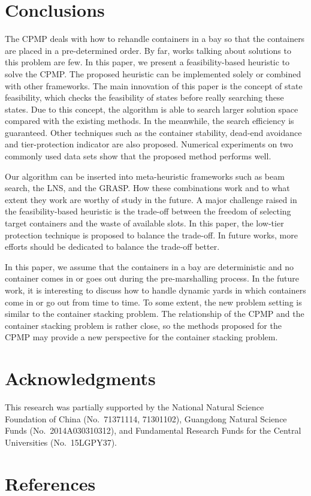 \documentclass[review,3p,times,12pt,number]{elsarticle}\usepackage{amsmath}\usepackage{amssymb}
\begin{document}
\section{Conclusions}
\label{sec:conclusion}
The CPMP deals with how to rehandle containers in a bay so that the containers are placed in a pre-determined order. By far, works talking about solutions to this problem are few.
In this paper, we present a feasibility-based heuristic to solve the CPMP\@. The proposed heuristic can be implemented solely or combined with other frameworks.
The main innovation of this paper is the concept of state feasibility, which checks the feasibility of states before really searching these states.
Due to this concept, the algorithm is able to search larger solution space compared with the existing methods. In the meanwhile, the search efficiency is guaranteed. Other techniques such as the container stability, dead-end avoidance and tier-protection indicator are also proposed.
Numerical experiments on two commonly used data sets show that the proposed method performs well.

Our algorithm can be inserted into meta-heuristic frameworks such as beam search, the LNS, and the GRASP\@. How these combinations work and to what extent they work are worthy of study in the future.
A major challenge raised in the feasibility-based heuristic is the trade-off between the freedom of selecting target containers and the waste of available slots. In this paper, the low-tier protection technique is proposed to balance the trade-off. In future works, more efforts should be dedicated to balance the trade-off better.

In this paper, we assume that the containers in a bay are deterministic and no container comes in or goes out during the pre-marshalling process. In the future work, it is interesting to discuss how to handle dynamic yards in which containers come in or go out from time to time. To some extent, the new problem setting is similar to the container stacking problem. The relationship of the CPMP and the container stacking problem is rather close, so the methods proposed for the CPMP may provide a new perspective for the container stacking problem.


\section*{Acknowledgments}

This research was partially supported by the National Natural Science Foundation of China (No.\ 71371114, 71301102), Guangdong Natural Science Funds (No.\ 2014A030310312), and Fundamental Research Funds for the Central Universities (No.\ 15LGPY37).

\section*{References}



\end{document}
